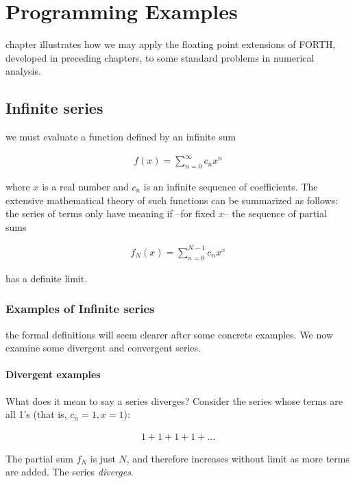 
\chapter{Programming Examples}

 chapter illustrates how we may apply the floating point extensions of FORTH, developed in preceding chapters, to some standard problems in numerical analysis.

\section{Infinite series}
 we must evaluate a function defined by an infinite sum

\begin{align}
    f(x) = \sum_{n=0}^{\infty}c_{n}x^{n}
    \label{eq:06_01}
\end{align}

where $x$ is a real number and $c_n$ is an infinite sequence of coefficients. The extensive mathematical theory of such functions can be summarized as follows: the series of terms only have meaning if --for fixed $x$-- the sequence of partial sums

\begin{align}
    f_{N}(x) = \sum_{n=0}^{N-1}c_{n}x^{x}
\end{align}

has a definite limit.

\subsection{Examples of Infinite series}
 the formal definitions will seem clearer after some concrete examples. We now examine some divergent and convergent series.

\subsubsection{Divergent examples}
What does it mean to say a series diverges? Consider the series whose terms are all 1's (that is, $c_n = 1, x = 1$):

\begin{align}
    1 + 1 + 1 + 1 + ...
\end{align}

The partial sum $f_N$ is just $N$, and therefore increases without limit as more terms are added. The series \textit{diverges}.

